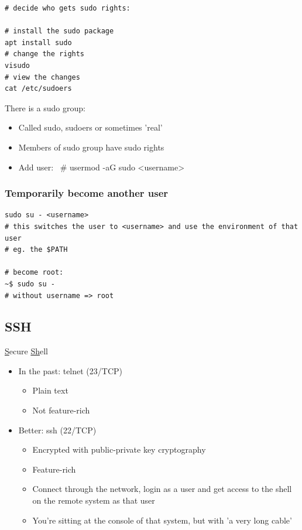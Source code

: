 \documentclass{article}
\begin{document}
\begin{verbatim}
# decide who gets sudo rights:

# install the sudo package
apt install sudo
# change the rights
visudo
# view the changes
cat /etc/sudoers
\end{verbatim}

There is a sudo group:

\begin{itemize}
    \item Called sudo, sudoers or sometimes 'real'
    \item Members of sudo group have sudo rights
    \item Add user: ~\# usermod -aG sudo <username>
\end{itemize}

\subsubsection{Temporarily become another user}

\begin{verbatim}
sudo su - <username>
# this switches the user to <username> and use the environment of that user
# eg. the $PATH

# become root:
~$ sudo su -
# without username => root
\end{verbatim}


\subsection{SSH}

\underline{S}ecure \underline{Sh}ell

\begin{itemize}
    \item In the past: telnet (23/TCP)
    \begin{itemize}
        \item Plain text
        \item Not feature-rich
    \end{itemize}
    \item Better: ssh (22/TCP)
    \begin{itemize}
        \item Encrypted with public-private key cryptography
        \item Feature-rich
        \item Connect through the network, login as a user and get access to the shell on the remote system as that user
        \item You're sitting at the console of that system, but with 'a very long cable'
    \end{itemize}
\end{itemize}
\end{document}
